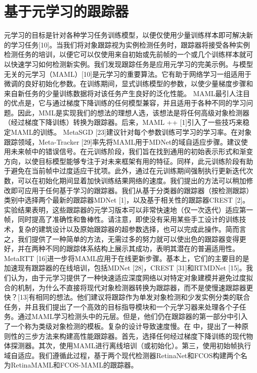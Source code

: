 \section{基于元学习的跟踪器} %
元学习的目标是针对各种学习任务训练模型，以便仅使用少量训练样本即可解决新的学习任务[10]。当我们将对象跟踪视为实例检测任务时，跟踪器将接受各种实例检测任务的培训，以便它可以仅使用来自初始或先前帧的一个或几个训练样本就可以快速学习如何检测新实例。我们发现跟踪任务是应用元学习的完美示例。与模型无关的元学习（MAML）[10]是元学习的重要算法。它有助于网络学习一组适用于微调的良好初始化参数。在训练期间，显式训练模型的参数，以使少量梯度步骤和来自新任务的少量训练数据将对该任务产生良好的泛化性能。 MAML最引人注目的优点是，它与通过梯度下降训练的任何模型兼容，并且适用于各种不同的学习问题。因此，MML是实现我们的想法的理想人选，该想法是将任何高级对象检测器（经过梯度下降训练）转换为跟踪器。后来，MAML ++ [1]引入了一些技巧来稳定MAML的训练。 MetaSGD [23]建议针对每个参数训练可学习的学习率。在对象跟踪领域，Meta-Tracker [29]率先将MAML用于MDNet的域自适应步骤。建议使用未来帧中的错误信号。在元训练阶段，我们旨在找到通用的初始表示形式和渐变方向，以使目标模型能够专注于对未来框架有用的特征。同样，此元训练阶段有助于避免在当前帧中过度适应干扰项。此外，通过在元训练期间强制执行更新迭代次数，可以在初始化期间显着加快训练结果网络的速度。我们提出的方法可以稍加修改即可应用于任何基于学习的跟踪器。我们从基于分类器的跟踪器（按检测跟踪）类别中选择两个最新的跟踪器MDNet [1]，以及基于相关性的跟踪器CREST [2]。实验结果表明，这些跟踪器的元学习版本可以非常快速地（仅一次迭代）适应第一帧，同时提高了准确性和鲁棒性。请注意，即使没有采用某些手工设计的训练技术，复杂的建筑设计以及原始跟踪器的超参数选择，也可以完成此操作。简而言之，我们提供了一种简单的方法，无需过多的努力就可以使出色的跟踪器变得更好，并在两种不同的跟踪体系结构上展示其成功，表明其潜在的普遍适用性。 MetaRTT [16]进一步将MAML应用于在线更新步骤。基本上，它们的主要目的是加速现有跟踪器的在线培训，包括MDNet [28]，CREST [31]和RTMDNet [15]。我们认为，由于元学习提供了一种快速适应深度网络以对特定对象建模并避免过度拟合的机制，为什么不直接将现代对象检测器转换为跟踪器，而不是使慢速跟踪器更快？[13]有相同的想法。他们建议将跟踪作为单发对象检测和少发实例分类的联合任务，并且我们提出了一个高效的目标指导模块和一个元学习器来处理各个子任务。通过MAML学习检测头中的元层。但是，他们仍在跟踪器的第一部分中引入了一个称为类级对象检测的模板。复杂的设计导致速度慢。在 \cite{TrackingBy} 中，提出了一种原则性的三步方法来构建高性能跟踪器。首先，选择任何经过梯度下降训练的现代物体探测器。其次，使用MAML进行离线培训（或初始化）。第三，使用初始帧执行域自适应。我们遵循此过程，基于两个现代检测器RetinaNet和FCOS构建两个名为RetinaMAML和FCOS-MAML的跟踪器。
